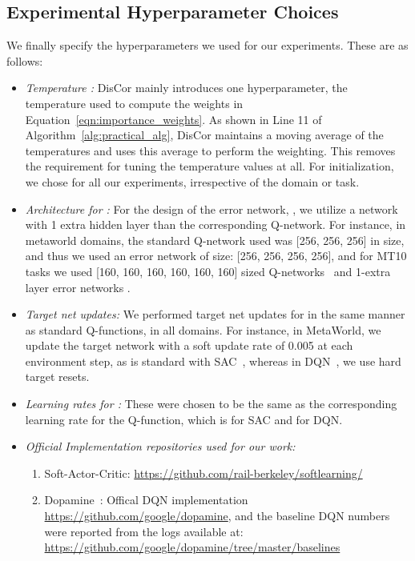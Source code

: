 \documentclass[jmlr]{article}
\begin{document}
\subsection{Experimental Hyperparameter Choices}
\label{sec:app_exp_details}
We finally specify the hyperparameters we used for our experiments. These are as follows:
\begin{itemize}
    \item \textit{Temperature :} DisCor mainly introduces one hyperparameter, the temperature  used to compute the weights  in Equation~\ref{eqn:importance_weights}. As shown in Line 11 of Algorithm~\ref{alg:practical_alg}, DisCor maintains a moving average of the temperatures and uses this average to perform the weighting. This removes the requirement for tuning the temperature values at all. For initialization, we chose  for all our experiments, irrespective of the domain or task. 
    \item \textit{Architecture for :} For the design of the error network, , we utilize a network with 1 extra hidden layer than the corresponding Q-network. For instance, in metaworld domains, the standard Q-network used was [256, 256, 256] in size, and thus we used an error network of size: [256, 256, 256, 256], and for MT10 tasks we used [160, 160, 160, 160, 160, 160] sized Q-networks~\citep{yu2020gradient} and 1-extra layer error networks .
    \item \textit{Target net updates:} We performed target net updates for  in the same manner as standard Q-functions, in all domains. For instance, in MetaWorld, we update the target network  with a soft update rate of 0.005 at each environment step, as is standard with SAC~\cite{haarnoja2018sacapps}, whereas in DQN~\citep{Mnih2015}, we use hard target resets.
    \item \textit{Learning rates for :} These were chosen to be the same as the corresponding learning rate for the Q-function, which is  for SAC and  for DQN.
    \item \textit{Official Implementation repositories used for our work:} 
        \begin{enumerate}
            \item Soft-Actor-Critic: \url{https://github.com/rail-berkeley/softlearning/}
            \item Dopamine~\citep{castro18dopamine}: Offical DQN implementation \url{https://github.com/google/dopamine}, and the baseline DQN numbers were reported from the logs available at: \url{https://github.com/google/dopamine/tree/master/baselines}

\end{enumerate}
\end{itemize}
\end{document}
